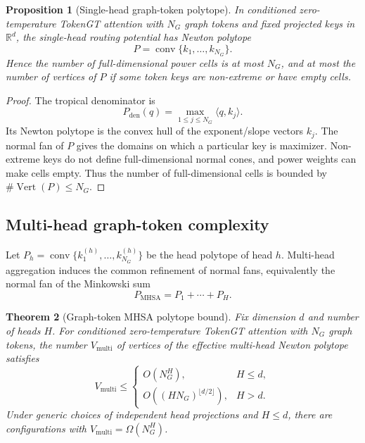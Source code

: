\documentclass[11pt]{article}
\newtheorem{theorem}{Theorem}[section]
\newtheorem{proposition}[theorem]{Proposition}
\DeclareMathOperator{\conv}{conv}
\DeclareMathOperator{\Vtx}{Vert}
\newcommand{\R}{\mathbb{R}}
\begin{document}
\begin{proposition}[Single-head graph-token polytope]
\label{prop:single-head}
In conditioned zero-temperature TokenGT attention with $N_G$ graph tokens and fixed projected keys in $\R^d$, the single-head routing potential has Newton polytope
\[
  P=\conv\{k_1,\dots,k_{N_G}\}.
\]
Hence the number of full-dimensional power cells is at most $N_G$, and at most the number of vertices of $P$ if some token keys are non-extreme or have empty cells.
\end{proposition}

\begin{proof}
The tropical denominator is
\[
  P_{\mathrm{den}}(q)=\max_{1\le j\le N_G}\langle q,k_j\rangle.
\]
Its Newton polytope is the convex hull of the exponent/slope vectors $k_j$.  The normal fan of $P$ gives the domains on which a particular key is maximizer.  Non-extreme keys do not define full-dimensional normal cones, and power weights can make cells empty.  Thus the number of full-dimensional cells is bounded by $\#\Vtx(P)\le N_G$.
\end{proof}

\subsection{Multi-head graph-token complexity}

Let $P_h=\conv\{k^{(h)}_1,\dots,k^{(h)}_{N_G}\}$ be the head polytope of head $h$.  Multi-head aggregation induces the common refinement of normal fans, equivalently the normal fan of the Minkowski sum
\[
  P_{\mathrm{MHSA}}=P_1+\cdots+P_H.
\]

\begin{theorem}[Graph-token MHSA polytope bound]
\label{thm:mhsa-graph}
Fix dimension $d$ and number of heads $H$.  For conditioned zero-temperature TokenGT attention with $N_G$ graph tokens, the number $V_{\mathrm{multi}}$ of vertices of the effective multi-head Newton polytope satisfies
\[
  V_{\mathrm{multi}}
  \le
  \begin{cases}
    O(N_G^H), & H\le d,\\
    O((HN_G)^{\lfloor d/2\rfloor}), & H>d.
  \end{cases}
\]
Under generic choices of independent head projections and $H\le d$, there are configurations with $V_{\mathrm{multi}}=\Omega(N_G^H)$.
\end{theorem}
\end{document}
